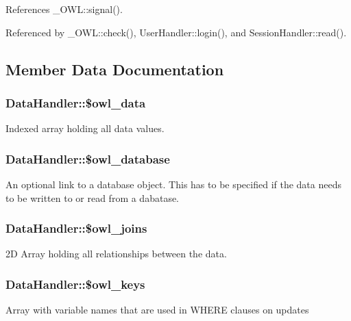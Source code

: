 References \_\-OWL::signal().



Referenced by \_\-OWL::check(), UserHandler::login(), and SessionHandler::read().



\subsection{Member Data Documentation}
\subsubsection[{\$owl\_\-data}]{\setlength{\rightskip}{0pt plus 5cm}DataHandler::\$owl\_\-data}\label{classDataHandler_a329b5524c379e0db6c4d5ce59f3c414f}
Indexed array holding all data values. 
\subsubsection[{\$owl\_\-database}]{\setlength{\rightskip}{0pt plus 5cm}DataHandler::\$owl\_\-database}\label{classDataHandler_a3ac49aa018e0ebe4c74f5a636d455a8b}
An optional link to a database object. This has to be specified if the data needs to be written to or read from a dabatase. 
\subsubsection[{\$owl\_\-joins}]{\setlength{\rightskip}{0pt plus 5cm}DataHandler::\$owl\_\-joins}\label{classDataHandler_ada9b697f81ea82d269077f9c7445791d}
2D Array holding all relationships between the data. 
\subsubsection[{\$owl\_\-keys}]{\setlength{\rightskip}{0pt plus 5cm}DataHandler::\$owl\_\-keys}\label{classDataHandler_a8d398720bce975159b2d13ad7a941bc7}
Array with variable names that are used in WHERE clauses on updates 
